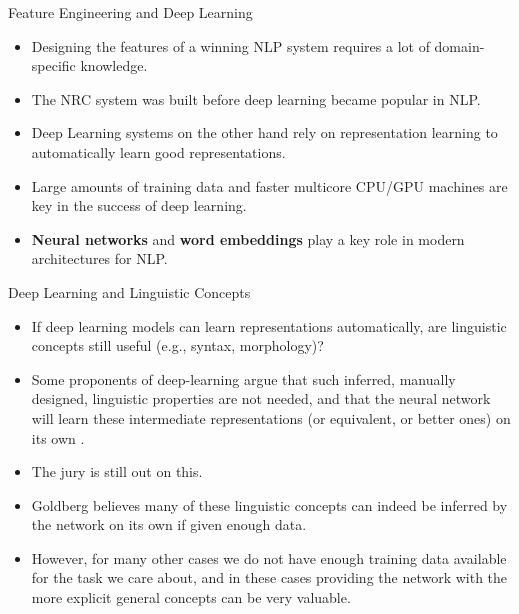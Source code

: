 \documentclass[handout]{beamer}
\begin{document}
\begin{frame}{Feature Engineering and Deep Learning}
\begin{scriptsize}
\begin{itemize}
\item Designing the features of a winning NLP system requires a lot of domain-specific knowledge.
\item The NRC system was built before deep learning became popular in NLP.
\item Deep Learning systems on the other hand rely on representation learning to automatically learn good representations.
\item Large amounts of training data and faster multicore CPU/GPU machines are key in the success of deep learning. 
\item \textbf{Neural networks} and \textbf{word embeddings} play a key role in modern  architectures for NLP.

\end{itemize}
\end{scriptsize}
\end{frame}


\begin{frame}{Deep Learning and Linguistic Concepts}
\begin{scriptsize}
\begin{itemize}
\item If deep learning models can learn representations automatically, are linguistic concepts still useful (e.g., syntax, morphology)?
\item Some proponents of deep-learning argue that such inferred, manually designed, linguistic properties are not needed, and that the neural network will learn
these intermediate representations (or equivalent, or better ones) on its own \cite{goldberg2016primer}. 
\item The jury is still out on this.
\item Goldberg believes many of these linguistic concepts can indeed be inferred by the network on its own if given enough data.
\item However, for many other cases we do not have enough training data available for the task we care about, and in these cases providing the network with the more explicit general concepts can be very valuable.
\end{itemize}
\end{scriptsize}
\end{frame}
\end{document}
